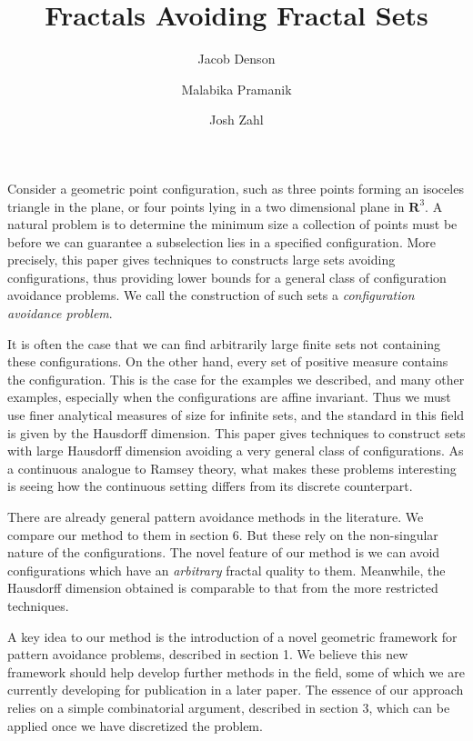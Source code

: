 \documentclass{article}
\title{Fractals Avoiding Fractal Sets}
\author{Jacob Denson\\ \and Malabika Pramanik\\ \and Josh Zahl}
\theoremstyle{plain}
\theoremstyle{plain}
\begin{document}
\maketitle


\begin{abstract}
	\blindtext[1]
\end{abstract}


Consider a geometric point configuration, such as three points forming an isoceles triangle in the plane, or four points lying in a two dimensional plane in $\mathbf{R}^3$. A natural problem is to determine the minimum size a collection of points must be before we can guarantee a subselection lies in a specified configuration. More precisely, this paper gives techniques to constructs large sets avoiding configurations, thus providing lower bounds for a general class of configuration avoidance problems. We call the construction of such sets a {\it configuration avoidance problem}.

It is often the case that we can find arbitrarily large finite sets not containing these configurations. On the other hand, every set of positive measure contains the configuration. This is the case for the examples we described, and many other examples, especially when the configurations are affine invariant. Thus we must use finer analytical measures of size for infinite sets, and the standard in this field is given by the Hausdorff dimension. This paper gives techniques to construct sets with large Hausdorff dimension avoiding a very general class of configurations. As a continuous analogue to Ramsey theory, what makes these problems interesting is seeing how the continuous setting differs from its discrete counterpart.

There are already general pattern avoidance methods in the literature. We compare our method to them in section 6. But these rely on the non-singular nature of the configurations. The novel feature of our method is we can avoid configurations which have an {\it arbitrary} fractal quality to them. Meanwhile, the Hausdorff dimension obtained is comparable to that from the more restricted techniques.

A key idea to our method is the introduction of a novel geometric framework for pattern avoidance problems, described in section 1. We believe this new framework should help develop further methods in the field, some of which we are currently developing for publication in a later paper. The essence of our approach relies on a simple combinatorial argument, described in section 3, which can be applied once we have discretized the problem.
\end{document}
